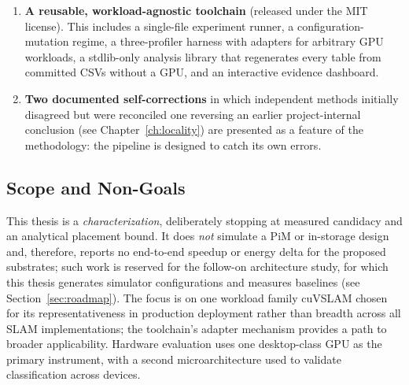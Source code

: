 \begin{enumerate}
\item \textbf{A reusable, workload-agnostic toolchain} (released under the MIT license). This includes a single-file experiment runner, a configuration-mutation regime, a three-profiler harness with adapters for arbitrary GPU workloads, a stdlib-only analysis library that regenerates every table from committed CSVs without a GPU, and an interactive evidence dashboard.

\item \textbf{Two documented self-corrections} in which independent methods initially disagreed but were reconciled one reversing an earlier project-internal conclusion (see Chapter~\ref{ch:locality}) are presented as a feature of the methodology: the pipeline is designed to catch its own errors.

\end{enumerate}

\subsection{Scope and Non-Goals}
This thesis is a \emph{characterization}, deliberately stopping at measured candidacy and an analytical placement bound. It does \emph{not} simulate a PiM or in-storage design and, therefore, reports no end-to-end speedup or energy delta for the proposed substrates; such work is reserved for the follow-on architecture study, for which this thesis generates simulator configurations and measures baselines (see Section~\ref{sec:roadmap}). The focus is on one workload family cuVSLAM chosen for its representativeness in production deployment rather than breadth across all SLAM implementations; the toolchain's adapter mechanism provides a path to broader applicability. Hardware evaluation uses one desktop-class GPU as the primary instrument, with a second microarchitecture used to validate classification across devices.

